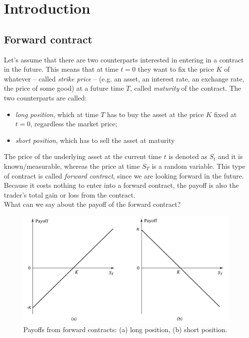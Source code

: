 \chapter{Introduction} %
\section{Forward contract} 
Let's assume that there are two counterparts interested in entering in a contract in the future. This means that at time $t=0$ they want to fix the price $K$ of whatever -- called \emph{strike price} -- (e.g. an asset, an interest rate, an exchange rate, the price of some good) at a future time $T$, called \emph{maturity} of the contract. The two counterparts are called:
\begin{itemize}
    \item \emph{long position}, which at time $T$ has to buy the asset at the price $K$ fixed at $t=0$, regardless the market price;
    \item \emph{short position}, which has to sell the asset at maturity
\end{itemize}
The price of the underlying asset at the current time $t$ is denoted as $S_t$ and it is known/measurable, whereas the price at time $S_T$ is a random variable. This type of contract is called \emph{forward contract}, since we are looking forward in the future. Because it costs nothing to enter into a forward contract, the payoff is also the trader’s total gain or loss from the contract.\\
What can we say about the payoff of the forward contract?
\begin{figure}
    \centering
    \includegraphics[scale=0.2]{fig/fc_payoff.png}
    \caption{Payoffs from forward contracts: (a) long position, (b) short position.}
    \label{fig:fc_payoff}
\end{figure}

